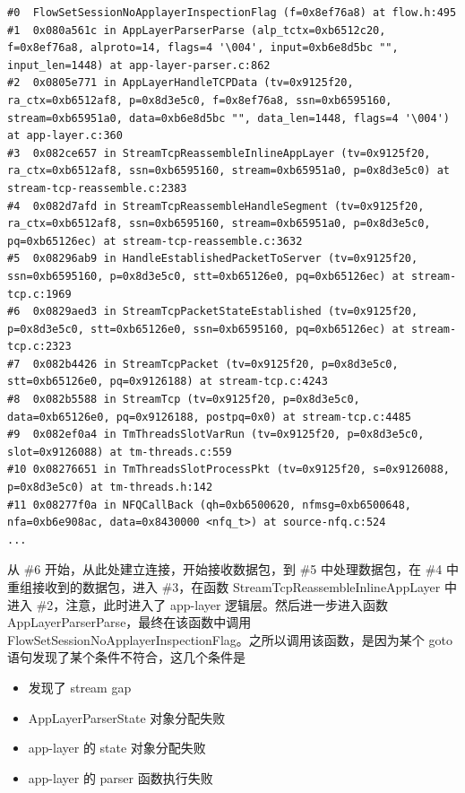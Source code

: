 \begin{lstlisting}
#0  FlowSetSessionNoApplayerInspectionFlag (f=0x8ef76a8) at flow.h:495
#1  0x080a561c in AppLayerParserParse (alp_tctx=0xb6512c20, f=0x8ef76a8, alproto=14, flags=4 '\004', input=0xb6e8d5bc "", input_len=1448) at app-layer-parser.c:862
#2  0x0805e771 in AppLayerHandleTCPData (tv=0x9125f20, ra_ctx=0xb6512af8, p=0x8d3e5c0, f=0x8ef76a8, ssn=0xb6595160, stream=0xb65951a0, data=0xb6e8d5bc "", data_len=1448, flags=4 '\004') at app-layer.c:360
#3  0x082ce657 in StreamTcpReassembleInlineAppLayer (tv=0x9125f20, ra_ctx=0xb6512af8, ssn=0xb6595160, stream=0xb65951a0, p=0x8d3e5c0) at stream-tcp-reassemble.c:2383
#4  0x082d7afd in StreamTcpReassembleHandleSegment (tv=0x9125f20, ra_ctx=0xb6512af8, ssn=0xb6595160, stream=0xb65951a0, p=0x8d3e5c0, pq=0xb65126ec) at stream-tcp-reassemble.c:3632
#5  0x08296ab9 in HandleEstablishedPacketToServer (tv=0x9125f20, ssn=0xb6595160, p=0x8d3e5c0, stt=0xb65126e0, pq=0xb65126ec) at stream-tcp.c:1969
#6  0x0829aed3 in StreamTcpPacketStateEstablished (tv=0x9125f20, p=0x8d3e5c0, stt=0xb65126e0, ssn=0xb6595160, pq=0xb65126ec) at stream-tcp.c:2323
#7  0x082b4426 in StreamTcpPacket (tv=0x9125f20, p=0x8d3e5c0, stt=0xb65126e0, pq=0x9126188) at stream-tcp.c:4243
#8  0x082b5588 in StreamTcp (tv=0x9125f20, p=0x8d3e5c0, data=0xb65126e0, pq=0x9126188, postpq=0x0) at stream-tcp.c:4485
#9  0x082ef0a4 in TmThreadsSlotVarRun (tv=0x9125f20, p=0x8d3e5c0, slot=0x9126088) at tm-threads.c:559
#10 0x08276651 in TmThreadsSlotProcessPkt (tv=0x9125f20, s=0x9126088, p=0x8d3e5c0) at tm-threads.h:142
#11 0x08277f0a in NFQCallBack (qh=0xb6500620, nfmsg=0xb6500648, nfa=0xb6e908ac, data=0x8430000 <nfq_t>) at source-nfq.c:524
...
\end{lstlisting}

从 {\cf \#6} 开始，从此处建立连接，开始接收数据包，到 {\cf \#5} 中处理数据包，在 {\cf \#4} 中重组接收到的数据包，进入 {\cf \#3}，在函数 {\cf StreamTcpReassembleInlineAppLayer} 中进入 {\cf \#2}，注意，此时进入了 app-layer 逻辑层。然后进一步进入函数 {\cf AppLayerParserParse}，最终在该函数中调用 {\cf FlowSetSessionNoApplayerInspectionFlag}。之所以调用该函数，是因为某个 {\cf goto} 语句发现了某个条件不符合，这几个条件是

\begin{itemize}
    \item 发现了 stream gap
    \item {\cf AppLayerParserState} 对象分配失败
    \item app-layer 的 state 对象分配失败
    \item app-layer 的 parser 函数执行失败
\end{itemize}
